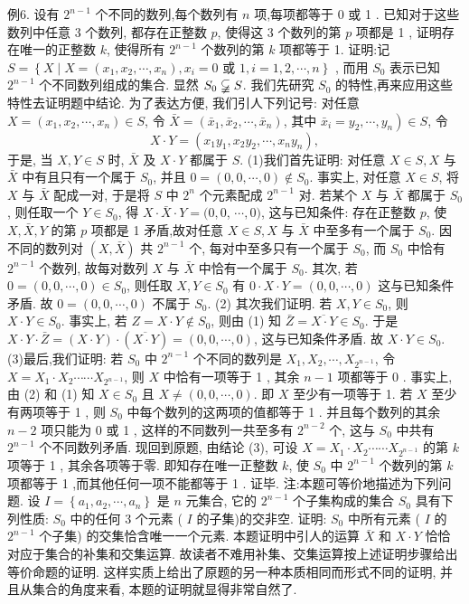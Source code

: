 例6. 设有 $2^{n-1}$ 个不同的数列,每个数列有 $n$ 项,每项都等于 0 或 1 . 已知对于这些数列中任意 3 个数列, 都存在正整数 $p$, 使得这 3 个数列的第 $p$ 项都是 1 , 证明存在唯一的正整数 $k$, 使得所有 $2^{n-1}$ 个数列的第 $k$ 项都等于 1. 
证明:记 $S=\left\{X \mid X=\left(x_1, x_2, \cdots, x_n\right), x_i=0\right.$ 或 $\left.1, i=1,2, \cdots, n\right\}$ , 而用 $S_0$ 表示已知 $2^{n-1}$ 个不同数列组成的集合.
显然 $S_0 \varsubsetneqq S$. 我们先研究 $S_0$ 的特性,再来应用这些特性去证明题中结论.
为了表达方便, 我们引人下列记号:
对任意 $X=\left(x_1, x_2, \cdots, x_n\right) \in S$, 令 $\bar{X}=\left(\bar{x}_1, \bar{x}_2, \cdots, \bar{x}_n\right)$, 其中 $\bar{x}_i= \left.y_2, \cdots, y_n\right) \in S$, 令
$$
X \cdot Y=\left(x_1 y_1, x_2 y_2, \cdots, x_n y_n\right),
$$
于是, 当 $X, Y \in S$ 时, $\bar{X}$ 及 $X \cdot Y$ 都属于 $S$.
(1)我们首先证明: 对任意 $X \in S, X$ 与 $\bar{X}$ 中有且只有一个属于 $S_0$, 并且 $0=(0,0, \cdots, 0) \notin S_0$.
事实上, 对任意 $X \in S$, 将 $X$ 与 $\bar{X}$ 配成一对, 于是将 $S$ 中 $2^n$ 个元素配成 $2^{n-1}$ 对.
若某个 $X$ 与 $\bar{X}$ 都属于 $S_0$, 则任取一个 $Y \in S_0$, 得 $X \cdot \bar{X} \cdot Y=(0,0$, $\cdots, 0)$, 这与已知条件: 存在正整数 $p$, 使 $X, \bar{X}, Y$ 的第 $p$ 项都是 1 矛盾,故对任意 $X \in S, X$ 与 $\bar{X}$ 中至多有一个属于 $S_0$. 因不同的数列对 $(X, \bar{X})$ 共 $2^{n-1}$ 个, 每对中至多只有一个属于 $S_0$, 而 $S_0$ 中恰有 $2^{n-1}$ 个数列, 故每对数列 $X$ 与 $\bar{X}$ 中恰有一个属于 $S_0$. 其次, 若 $0=(0,0, \cdots, 0) \in S_0$, 则任取 $X, Y \in S_0$ 有 $0 \cdot X \cdot Y=(0,0, \cdots, 0)$ 这与已知条件矛盾.
故 $0=(0,0, \cdots, 0)$ 不属于 $S_0$.
(2) 其次我们证明.
若 $X, Y \in S_0$, 则 $X \cdot Y \in S_0$.
事实上, 若 $Z=X \cdot Y \notin S_0$, 则由 (1) 知 $\bar{Z}=\overline{X \cdot Y} \in S_0$. 于是 $X \cdot Y \cdot \bar{Z}=(X \cdot Y) \cdot(\overline{X \cdot Y})=(0,0, \cdots, 0)$, 这与已知条件矛盾.
故 $X \cdot Y \in S_0$.
(3)最后,我们证明: 若 $S_0$ 中 $2^{n-1}$ 个不同的数列是 $X_1, X_2, \cdots, X_{2^{n-1}}$, 令 $X=X_1 \cdot X_2 \cdots \cdots X_{2^{n-1}}$, 则 $X$ 中恰有一项等于 1 , 其余 $n-1$ 项都等于 0 .
事实上, 由 (2) 和 (1) 知 $X \in S_0$ 且 $X \neq(0,0, \cdots, 0)$. 即 $X$ 至少有一项等于 1. 若 $X$ 至少有两项等于 1 , 则 $S_0$ 中每个数列的这两项的值都等于 1 . 并且每个数列的其余 $n-2$ 项只能为 0 或 1 , 这样的不同数列一共至多有 $2^{n-2}$ 个, 这与 $S_0$ 中共有 $2^{n-1}$ 个不同数列矛盾.
现回到原题, 由结论 (3), 可设 $X=X_1 \cdot X_2 \cdots \cdots X_{2^{n-1}}$ 的第 $k$ 项等于 1 , 其余各项等于零.
即知存在唯一正整数 $k$, 使 $S_0$ 中 $2^{n-1}$ 个数列的第 $k$ 项都等于 1 ,而其他任何一项不能都等于 1 . 证毕.
注:本题可等价地描述为下列问题.
设 $I=\left\{a_1, a_2, \cdots, a_n\right\}$ 是 $n$ 元集合, 它的 $2^{n-1}$ 个子集构成的集合 $S_0$ 具有下列性质: $S_0$ 中的任何 3 个元素 ( $I$ 的子集)的交非空.
证明: $S_0$ 中所有元素 ( $I$ 的 $2^{n-1}$ 个子集) 的交集恰含唯一一个元素.
本题证明中引人的运算 $\bar{X}$ 和 $X \cdot Y$ 恰恰对应于集合的补集和交集运算.
故读者不难用补集、交集运算按上述证明步骤给出等价命题的证明.
这样实质上给出了原题的另一种本质相同而形式不同的证明, 并且从集合的角度来看, 本题的证明就显得非常自然了.


